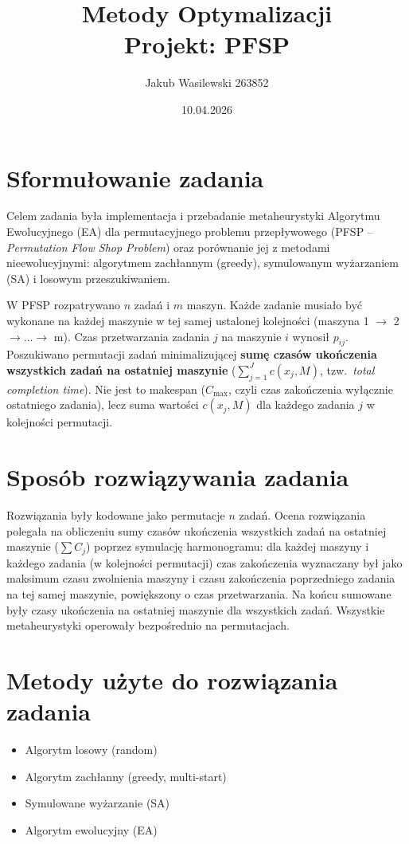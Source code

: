 \documentclass[11pt,a4paper]{article}
\title{Metody Optymalizacji\\Projekt: PFSP}
\author{Jakub Wasilewski 263852}
\date{10.04.2026}
\begin{document}
\maketitle

\tableofcontents
\clearpage

\section{Sformułowanie zadania}
Celem zadania była implementacja i przebadanie metaheurystyki Algorytmu Ewolucyjnego (EA) dla permutacyjnego problemu przepływowego (PFSP -- \textit{Permutation Flow Shop Problem}) oraz porównanie jej z metodami nieewolucyjnymi: algorytmem zachłannym (greedy), symulowanym wyżarzaniem (SA) i losowym przeszukiwaniem.

W PFSP rozpatrywano $n$ zadań i $m$ maszyn. Każde zadanie musiało być wykonane na każdej maszynie w tej samej ustalonej kolejności (maszyna 1 $\rightarrow$ 2 $\rightarrow \ldots \rightarrow$ m). Czas przetwarzania zadania $j$ na maszynie $i$ wynosił $p_{ij}$. Poszukiwano permutacji zadań minimalizującej \textbf{sumę czasów ukończenia wszystkich zadań na ostatniej maszynie} ($\sum_{j=1}^{J} c(x_j, M)$, tzw.\ \emph{total completion time}). Nie jest to makespan ($C_{\max}$, czyli czas zakończenia wyłącznie ostatniego zadania), lecz suma wartości $c(x_j, M)$ dla każdego zadania $j$ w kolejności permutacji.

\section{Sposób rozwiązywania zadania}
Rozwiązania były kodowane jako permutacje $n$ zadań. Ocena rozwiązania polegała na obliczeniu sumy czasów ukończenia wszystkich zadań na ostatniej maszynie ($\sum C_j$) poprzez symulację harmonogramu: dla każdej maszyny i każdego zadania (w kolejności permutacji) czas zakończenia wyznaczany był jako maksimum czasu zwolnienia maszyny i czasu zakończenia poprzedniego zadania na tej samej maszynie, powiększony o czas przetwarzania. Na końcu sumowane były czasy ukończenia na ostatniej maszynie dla wszystkich zadań. Wszystkie metaheurystyki operowały bezpośrednio na permutacjach.

\section{Metody użyte do rozwiązania zadania}
\begin{itemize}
  \item Algorytm losowy (random)
  \item Algorytm zachłanny (greedy, multi-start)
  \item Symulowane wyżarzanie (SA)
  \item Algorytm ewolucyjny (EA)
\end{itemize}
\end{document}
